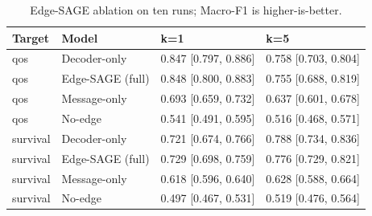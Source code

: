\begin{table}[tb]
\caption{Edge-SAGE ablation on ten runs; Macro-F1 is higher-is-better.}
\label{tab:stage7-ablation}
\begin{tabular}{llll}
\toprule
Target & Model & k=1 & k=5 \\
\midrule
qos & Decoder-only & 0.847 [0.797, 0.886] & 0.758 [0.703, 0.804] \\
qos & Edge-SAGE (full) & 0.848 [0.800, 0.883] & 0.755 [0.688, 0.819] \\
qos & Message-only & 0.693 [0.659, 0.732] & 0.637 [0.601, 0.678] \\
qos & No-edge & 0.541 [0.491, 0.595] & 0.516 [0.468, 0.571] \\
survival & Decoder-only & 0.721 [0.674, 0.766] & 0.788 [0.734, 0.836] \\
survival & Edge-SAGE (full) & 0.729 [0.698, 0.759] & 0.776 [0.729, 0.821] \\
survival & Message-only & 0.618 [0.596, 0.640] & 0.628 [0.588, 0.664] \\
survival & No-edge & 0.497 [0.467, 0.531] & 0.519 [0.476, 0.564] \\
\bottomrule
\end{tabular}
\end{table}
